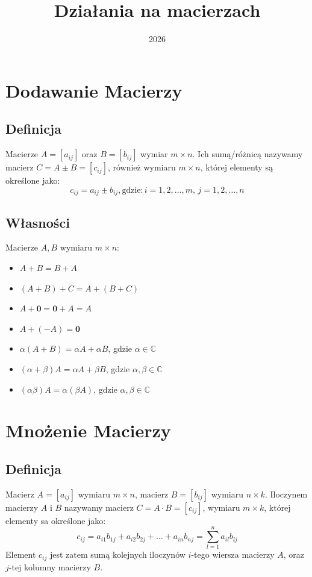 \documentclass{article}
\title{Działania na macierzach}
\date{2026}
\begin{document}
\maketitle

\section{Dodawanie Macierzy}
\subsection{Definicja}
Macierze $A=[a_{ij}]$ oraz $B=[b_{ij}]$ wymiar $m \times n$.
Ich sumą/różnicą nazywamy macierz $C=A \pm B=[c_{ij}]$, również wymiaru 
$m \times n$, której elementy są określone jako:
$$
    c_{ij} = a_{ij} \pm b_{ij}, \text{gdzie:}\,i = 1,2, \dots, m,\,j=1,2,\dots,n
$$
\subsection{Własności}
Macierze $A, B$ wymiaru $m \times n$:
\begin{itemize}
    \item $A + B = B + A$
    \item $(A + B) + C = A + (B + C)$
    \item $A + \mathbf{0} = \mathbf{0} + A = A$
    \item $A + (-A) = \mathbf{0}$
    \item $\alpha(A+B) = \alpha A + \alpha B$, gdzie $\alpha \in \mathbb{C}$
    \item $(\alpha + \beta)A = \alpha A + \beta B$, gdzie $\alpha, \beta \in \mathbb{C}$
    \item $(\alpha \beta)A = \alpha(\beta A)$, gdzie $\alpha,\beta \in \mathbb{C}$
\end{itemize}

\section{Mnożenie Macierzy}
\subsection{Definicja}
Macierz $A = [a_{ij}]$ wymiaru $m \times n$, macierz $B=[b_{ij}]$
wymiaru $n \times k$.
Iloczynem macierzy $A$ i $B$ nazywamy macierz $C = A \cdot B = [c_{ij}]$,
wymiaru $m \times k$, której elementy sa określone jako:
$$
    c_{ij} = a_{i1}b_{1j}+a_{i2}b_{2j}+ \dots +a_{in}b_{nj} = \sum_{l=1}^{n}{a_{il}b_{lj}}
$$
Element $c_{ij}$ jest zatem sumą kolejnych iloczynów $i$-tego 
wiersza macierzy $A$, oraz $j$-tej kolumny macierzy $B$.
\end{document}

